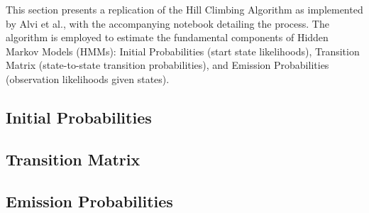 This section presents a replication of the Hill Climbing Algorithm as implemented by Alvi et al., with the accompanying notebook detailing the process. The algorithm is employed to estimate the fundamental components of Hidden Markov Models (HMMs): Initial Probabilities (start state likelihoods), Transition Matrix (state-to-state transition probabilities), and Emission Probabilities (observation likelihoods given states). 

\subsection{Initial Probabilities}

\subsection{Transition Matrix}

\subsection{Emission Probabilities}



